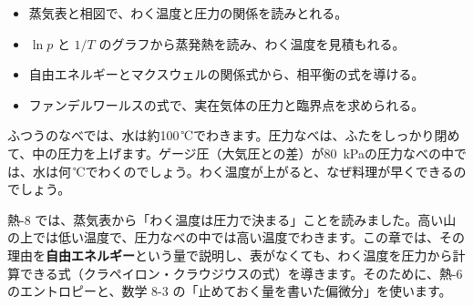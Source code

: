\begin{goal}
\begin{itemize}[label={\color{bkTheme}●}, leftmargin=1.6\zw, itemsep=0pt, topsep=1pt]
\item {}\enspace 蒸気表と相図で、わく温度と圧力の関係を読みとれる。
\item {}\enspace $\ln p$ と $1/T$ のグラフから蒸発熱を読み、わく温度を見積もれる。
\item {}\enspace 自由エネルギーとマクスウェルの関係式から、相平衡の式を導ける。
\item {}\enspace ファンデルワールスの式で、実在気体の圧力と臨界点を求められる。
\end{itemize}
\end{goal}

\begin{hatena}
\noindent\begin{minipage}[c]{0.56\linewidth}\raggedright
ふつうのなべでは、水は約100\,℃でわきます。圧力なべは、ふたをしっかり閉めて、中の圧力を上げます。ゲージ圧（大気圧との差）が\qty{80}{kPa}の圧力なべの中では、水は何\,℃でわくのでしょう。わく温度が上がると、なぜ料理が早くできるのでしょう。
\end{minipage}\hfill
\begin{minipage}[c]{0.4\linewidth}\centering
{}
\end{minipage}
\end{hatena}

\noindent 熱-8 では、蒸気表から「わく温度は圧力で決まる」ことを読みました。高い山の上では低い温度で、圧力なべの中では高い温度でわきます。この章では、その理由を\textbf{自由エネルギー}という量で説明し、表がなくても、わく温度を圧力から計算できる式（クラペイロン・クラウジウスの式）を導きます。そのために、熱-6 のエントロピーと、数学 8-3 の「止めておく量を書いた偏微分」を使います。

